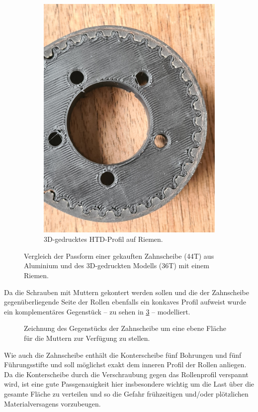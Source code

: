 \begin{figure}[h]
\begin{subfigure}{.49\textwidth}
				\includegraphics[width=\textwidth]{Assets/Printed-HTD_tooth_fit.jpg}
				\caption{3D-gedrucktes HTD-Profil auf Riemen.}
				\label{subfig:printed HTD}
			\end{subfigure}
			\caption{Vergleich der Passform einer gekauften Zahnscheibe (44T) aus Aluminium und des 3D-gedruckten Modells (36T) mit einem Riemen.}
			\label{fig:HTD profiles comparison}
		\end{figure}\par\medskip
		Da die Schrauben mit Muttern gekontert werden sollen und die der Zahnscheibe gegenüberliegende Seite der Rollen ebenfalls ein konkaves Profil aufweist wurde ein komplementäres Gegenstück -- zu sehen in \cref{fig:orangatang kegel flat face} -- modelliert.
		\begin{figure}[h]
			\centering
			
			\caption[Zeichnung des Gegenstücks der Zahnscheibe]{Zeichnung des Gegenstücks der Zahnscheibe um eine ebene Fläche für die Muttern zur Verfügung zu stellen.}
			\label{fig:orangatang kegel flat face}
		\end{figure}
		Wie auch die Zahnscheibe enthält die Konterscheibe fünf Bohrungen und fünf Führungsstifte und soll möglichst exakt dem inneren Profil der Rollen anliegen.
		Da die Konterscheibe durch die Verschraubung gegen das Rollenprofil verspannt wird, ist eine gute Passgenauigkeit hier insbesondere wichtig um die Last über die gesamte Fläche zu verteilen und so die Gefahr frühzeitigen und/oder plötzlichen Materialversagens vorzubeugen.

